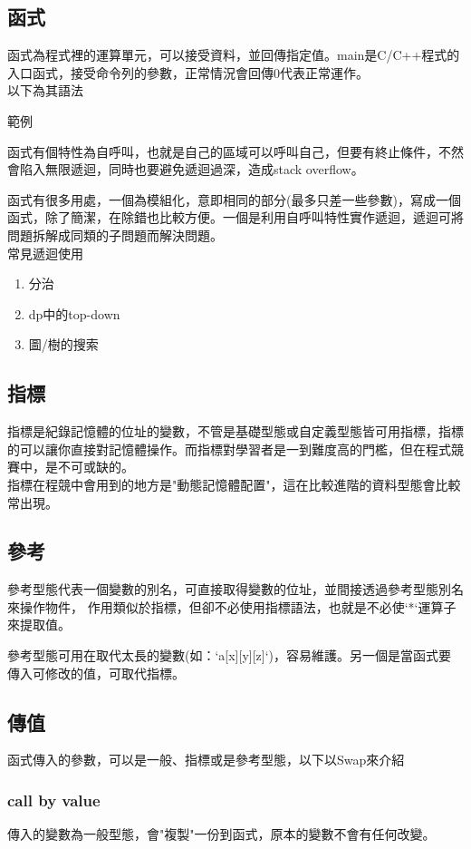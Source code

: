 \subsection{函式}
函式為程式裡的運算單元，可以接受資料，並回傳指定值。main是C/C++程式的入口函式，接受命令列的參數，正常情況會回傳0代表正常運作。\\
以下為其語法

範例

函式有個特性為自呼叫，也就是自己的區域可以呼叫自己，但要有終止條件，不然會陷入無限遞迴，同時也要避免遞迴過深，造成stack overflow。

函式有很多用處，一個為模組化，意即相同的部分(最多只差一些參數)，寫成一個函式，除了簡潔，在除錯也比較方便。一個是利用自呼叫特性實作遞迴，遞迴可將問題拆解成同類的子問題而解決問題。\\
常見遞迴使用
\begin{enumerate}
\item 分治
\item dp中的top-down
\item 圖/樹的搜索
\end{enumerate}

\subsection{指標}
指標是紀錄記憶體的位址的變數，不管是基礎型態或自定義型態皆可用指標，指標的可以讓你直接對記憶體操作。而指標對學習者是一到難度高的門檻，但在程式競賽中，是不可或缺的。\\ 指標在程競中會用到的地方是"動態記憶體配置"，這在比較進階的資料型態會比較常出現。


\subsection{參考}
參考型態代表一個變數的別名，可直接取得變數的位址，並間接透過參考型態別名來操作物件， 作用類似於指標，但卻不必使用指標語法，也就是不必使`*`運算子來提取值。

參考型態可用在取代太長的變數(如：`a[x][y][z]`)，容易維護。另一個是當函式要傳入可修改的值，可取代指標。
\subsection{傳值}
函式傳入的參數，可以是一般、指標或是參考型態，以下以Swap來介紹
\subsubsection{call by value}
傳入的變數為一般型態，會"複製"一份到函式，原本的變數不會有任何改變。

